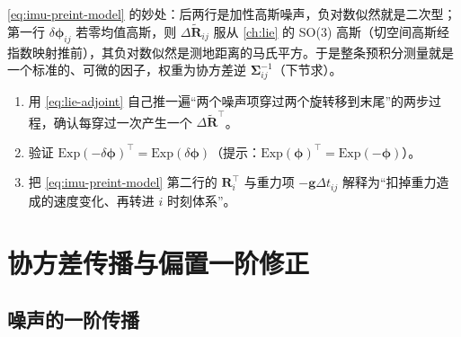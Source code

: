 \begin{insight}[为什么能放进因子图]\label{ins:why-factor}
\cref{eq:imu-preint-model} 的妙处：后两行是加性高斯噪声，负对数似然就是二次型；第一行 $\delta\boldsymbol\phi_{ij}$ 若零均值高斯，则 $\Delta\tilde{\mathbf R}_{ij}$ 服从 \cref{ch:lie} 的 SO(3) 高斯（切空间高斯经指数映射推前），其负对数似然是测地距离的马氏平方。于是整条预积分测量就是一个标准的、可微的因子，权重为协方差逆 $\boldsymbol\Sigma_{ij}^{-1}$（下节求）。
\end{insight}

\begin{practice}
\begin{enumerate}
  \item 用 \cref{eq:lie-adjoint} 自己推一遍“两个噪声项穿过两个旋转移到末尾”的两步过程，确认每穿过一次产生一个 $\Delta\tilde{\mathbf R}^\top$。
  \item 验证 $\mathrm{Exp}(-\delta\boldsymbol\phi)^\top=\mathrm{Exp}(\delta\boldsymbol\phi)$（提示：$\mathrm{Exp}(\boldsymbol\phi)^\top=\mathrm{Exp}(-\boldsymbol\phi)$）。
  \item 把 \cref{eq:imu-preint-model} 第二行的 $\mathbf R_i^\top$ 与重力项 $-\mathbf g\Delta t_{ij}$ 解释为“扣掉重力造成的速度变化、再转进 $i$ 时刻体系”。
\end{enumerate}
\end{practice}

\section{协方差传播与偏置一阶修正}
\label{sec:imu-cov}

\subsection{噪声的一阶传播}
\label{subsec:noise-prop}

